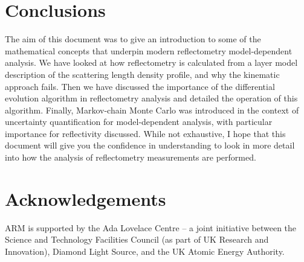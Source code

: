 \documentclass[
 reprint,
 superscriptaddress,
 amsmath,amssymb,
 aps,
]{revtex4-1}
\begin{document}
\section{Conclusions}
The aim of this document was to give an introduction to some of the mathematical concepts that underpin modern reflectometry model-dependent analysis. 
We have looked at how reflectometry is calculated from a layer model description of the scattering length density profile, and why the kinematic approach fails. 
Then we have discussed the importance of the differential evolution algorithm in reflectometry analysis and detailed the operation of this algorithm. 
Finally, Markov-chain Monte Carlo was introduced in the context of uncertainty quantification for model-dependent analysis, with particular importance for reflectivity discussed. 
While not exhaustive, I hope that this document will give you the confidence in understanding to look in more detail into how the analysis of reflectometry measurements are performed.

\section*{Acknowledgements}
ARM is supported by the Ada Lovelace Centre – a joint initiative between the Science and Technology Facilities Council (as part of UK Research and Innovation), Diamond Light Source, and the UK Atomic Energy Authority.




\end{document}
